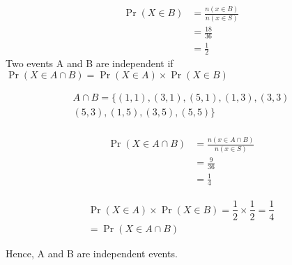 \documentclass[journal,11pt,twocolumn]{IEEEtran}
\providecommand{\pr}[1]{\ensuremath{\Pr\left(#1\right)}}
\providecommand{\brak}[1]{\ensuremath{\left(#1\right)}}
\begin{document}
\begin{align}
    \pr{X \in B} &= \frac{n\brak{x \in B}}{n\brak{x \in S}}\\
    &= \frac{18}{36}\\
    &= \frac{1}{2}
\end{align}
Two events A and B are independent if 
$\pr{X \in A \cap B } = \pr{X \in A}\times\pr{X \in B}$

\begin{multline}
    A \cap B = \{\brak{1,1},\brak{3,1},\brak{5,1},\brak{1,3},\brak{3,3}\\
    \brak{5,3},\brak{1,5},\brak{3,5},\brak{5,5}\}\\
\end{multline}

\begin{align}
    \pr{X \in A \cap B} &= \frac{n\brak{x \in A \cap B}}{n\brak{x \in S}}\\
    &= \frac{9}{36}\\
    &= \frac{1}{4}
\end{align}

\begin{multline}
    \pr{X \in A}\times\pr{X \in B} = \dfrac{1}{2}\times\dfrac{1}{2} = \dfrac{1}{4}\\
    = \pr{X \in A \cap B }
\end{multline}

Hence, A and B are independent events.
\end{document}
